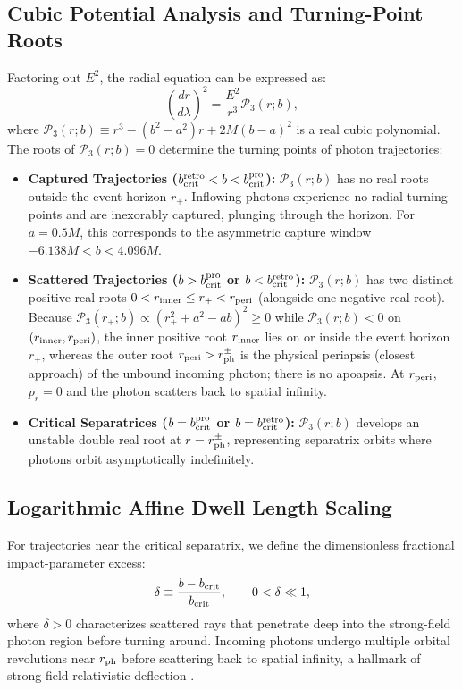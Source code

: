 \subsection{Cubic Potential Analysis and Turning-Point Roots}
Factoring out $E^2$, the radial equation can be expressed as:
\begin{equation}
    \left(\frac{dr}{d\lambda}\right)^2 = \frac{E^2}{r^3} \mathcal{P}_3(r; b),
\end{equation}
where $\mathcal{P}_3(r; b) \equiv r^3 - (b^2 - a^2)r + 2M(b - a)^2$ is a real cubic polynomial. The roots of $\mathcal{P}_3(r; b) = 0$ determine the turning points of photon trajectories:
\begin{itemize}
    \item \textbf{Captured Trajectories ($b_{\rm crit}^{\rm retro} < b < b_{\rm crit}^{\rm pro}$):}  
    $\mathcal{P}_3(r; b)$ has no real roots outside the event horizon $r_+$. Inflowing photons experience no radial turning points and are inexorably captured, plunging through the horizon. For $a = 0.5M$, this corresponds to the asymmetric capture window $-6.138M < b < 4.096M$.
    \item \textbf{Scattered Trajectories ($b > b_{\rm crit}^{\rm pro}$ or $b < b_{\rm crit}^{\rm retro}$):}  
    $\mathcal{P}_3(r; b)$ has two distinct positive real roots $0 < r_{\rm inner} \le r_+ < r_{\rm peri}$ (alongside one negative real root). Because $\mathcal{P}_3(r_+; b) \propto (r_+^2 + a^2 - ab)^2 \ge 0$ while $\mathcal{P}_3(r; b) < 0$ on $(r_{\rm inner}, r_{\rm peri})$, the inner positive root $r_{\rm inner}$ lies on or inside the event horizon $r_+$, whereas the outer root $r_{\rm peri} > r_{\rm ph}^\pm$ is the physical periapsis (closest approach) of the unbound incoming photon; there is no apoapsis. At $r_{\rm peri}$, $p_r = 0$ and the photon scatters back to spatial infinity.
    \item \textbf{Critical Separatrices ($b = b_{\rm crit}^{\rm pro}$ or $b = b_{\rm crit}^{\rm retro}$):}  
    $\mathcal{P}_3(r; b)$ develops an unstable double real root at $r = r_{\rm ph}^\pm$, representing separatrix orbits where photons orbit asymptotically indefinitely.
\end{itemize}

\subsection{Logarithmic Affine Dwell Length Scaling}
For trajectories near the critical separatrix, we define the dimensionless fractional impact-parameter excess:
\begin{equation}
    \delta \equiv \frac{b - b_{\rm crit}}{b_{\rm crit}}, \qquad 0 < \delta \ll 1,
    \label{eq:delta_fractional_excess}
\end{equation}
where $\delta > 0$ characterizes scattered rays that penetrate deep into the strong-field photon region before turning around. Incoming photons undergo multiple orbital revolutions near $r_{\rm ph}$ before scattering back to spatial infinity, a hallmark of strong-field relativistic deflection \cite{Bozza2002}.

